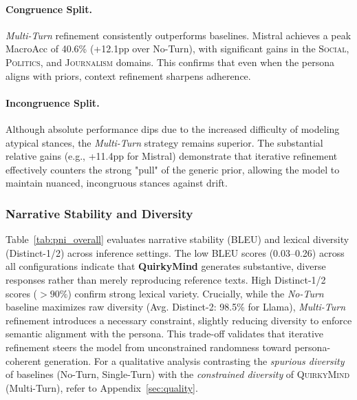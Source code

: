 \paragraph{Congruence Split.} \textit{Multi-Turn} refinement consistently outperforms baselines. Mistral achieves a peak MacroAcc of 40.6\% (+12.1pp over No-Turn), with significant gains in the \textsc{Social}, \textsc{Politics}, and \textsc{Journalism} domains. This confirms that even when the persona aligns with priors, context refinement sharpens adherence.

\paragraph{Incongruence Split.} Although absolute performance dips due to the increased difficulty of modeling atypical stances, the \textit{Multi-Turn} strategy remains superior. The substantial relative gains (e.g., +11.4pp for Mistral) demonstrate that iterative refinement effectively counters the strong "pull" of the generic prior, allowing the model to maintain nuanced, incongruous stances against drift.









\subsubsection{Narrative Stability and Diversity}
Table~\ref{tab:pni_overall} evaluates narrative stability (BLEU) and lexical diversity (Distinct-1/2) across inference settings. The low BLEU scores (0.03--0.26) across all configurations indicate that \textbf{QuirkyMind} generates substantive, diverse responses rather than merely reproducing reference texts. High Distinct-1/2 scores ($>90\%$) confirm strong lexical variety. Crucially, while the \textit{No-Turn} baseline maximizes raw diversity (Avg. Distinct-2: 98.5\% for Llama), \textit{Multi-Turn} refinement introduces a necessary constraint, slightly reducing diversity to enforce semantic alignment with the persona. This trade-off validates that iterative refinement steers the model from unconstrained randomness toward persona-coherent generation. For a qualitative analysis contrasting the \textit{spurious diversity} of baselines (No-Turn, Single-Turn) with the \textit{constrained diversity} of \textsc{QuirkyMind} (Multi-Turn), refer to Appendix~\ref{sec:quality}.







